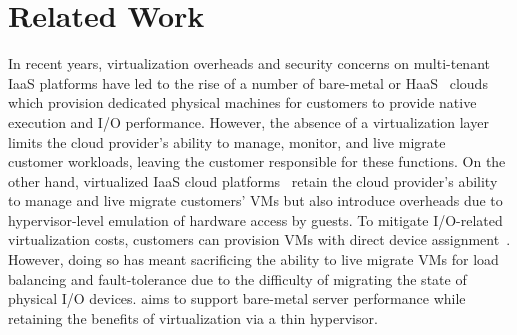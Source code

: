 
\section{Related Work}
In recent years, virtualization overheads and security concerns on 
multi-tenant IaaS platforms have led to the rise of a 
number of bare-metal or HaaS~\cite{softlayer,oracle,zenlayer,vultr,m2}
clouds which provision dedicated physical machines for customers
to provide native execution and I/O performance.
However, the absence of a virtualization layer 
limits the cloud provider's ability to manage, monitor, 
and live migrate~\cite{clark:2005,postcopy-osr}
customer workloads, leaving the customer responsible for 
these functions.
On the other hand, virtualized IaaS cloud platforms~\cite{gcp,azure,ec2}
retain the cloud provider's ability to manage and live migrate customers'
VMs but also introduce overheads  due to
hypervisor-level emulation of hardware access by guests. To mitigate I/O-related 
virtualization costs, customers can provision VMs with 
direct device assignment~\cite{intelvtd-paper,intelvtd-manual}. 
However, doing so has meant sacrificing the ability 
to live migrate VMs for load balancing and fault-tolerance
due to the difficulty of migrating the state of physical I/O devices.
\na aims to  support bare-metal server performance
while retaining the benefits of virtualization via a 
thin hypervisor.

